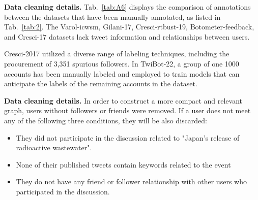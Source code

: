 \documentclass[10pt,twocolumn,letterpaper]{article}
\begin{document}
\noindent
\textbf{Data cleaning details.}
Tab.~\ref{tab:A6} displays the comparison of annotations between the datasets that have been manually annotated, as listed in Tab.~\ref{tab:2}. The Varol-icwsm, Gilani-17, Cresci-rtbust-19, Botometer-feedback, and Cresci-17 datasets lack tweet information and relationships between users.

\begin{table}[htbp]
  \centering
  \caption{Distribution of Labels in annotations. }
  \vspace{0.2cm}
\label{tab:A6}
\end{table}

Cresci-2017 utilized a diverse range of labeling techniques, including the procurement of 3,351 spurious followers. In TwiBot-22, a group of one 1000 accounts has been manually labeled and employed to train models that can anticipate the labels of the remaining accounts in the dataset.


\noindent
\textbf{Data cleaning details.}
In order to construct a more compact and relevant graph, users without followers or friends were removed. If a user does not meet any of the following three conditions, they will be also discarded:

\begin{itemize}
\vspace{-0.3cm}
\item They did not participate in the discussion related to "Japan's release of radioactive wastewater".
\vspace{-0.3cm}
\item None of their published tweets contain keywords related to the event
\vspace{-0.3cm}
\item They do not have any friend or follower relationship with other users who participated in the discussion.
\end{itemize}
\end{document}
